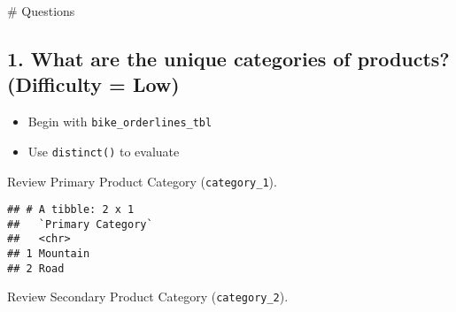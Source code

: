 \documentclass[]{article}
\newenvironment{Shaded}{\begin{snugshade}}{\end{snugshade}}
\newcommand{\DataTypeTok}[1]{\textcolor[rgb]{0.13,0.29,0.53}{#1}}
\newcommand{\DecValTok}[1]{\textcolor[rgb]{0.00,0.00,0.81}{#1}}
\newcommand{\KeywordTok}[1]{\textcolor[rgb]{0.13,0.29,0.53}{\textbf{#1}}}
\newcommand{\NormalTok}[1]{#1}
\newcommand{\OperatorTok}[1]{\textcolor[rgb]{0.81,0.36,0.00}{\textbf{#1}}}
\newcommand{\StringTok}[1]{\textcolor[rgb]{0.31,0.60,0.02}{#1}}
\providecommand{\tightlist}{%
  \setlength{\itemsep}{0pt}\setlength{\parskip}{0pt}}
\begin{document}
\# Questions

\hypertarget{what-are-the-unique-categories-of-products-difficulty-low}{%
\subsection{1. What are the unique categories of products? (Difficulty =
Low)}\label{what-are-the-unique-categories-of-products-difficulty-low}}

\begin{itemize}
\tightlist
\item
  Begin with \texttt{bike\_orderlines\_tbl}
\item
  Use \texttt{distinct()} to evaluate
\end{itemize}

Review Primary Product Category (\texttt{category\_1}).

\begin{Shaded}
\end{Shaded}

\begin{verbatim}
## # A tibble: 2 x 1
##   `Primary Category`
##   <chr>             
## 1 Mountain          
## 2 Road
\end{verbatim}

Review Secondary Product Category (\texttt{category\_2}).

\begin{Shaded}
\end{Shaded}
\end{document}
